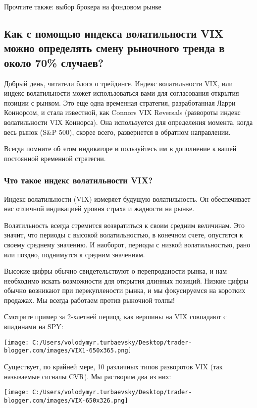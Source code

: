 \documentclass[a5paper]{article}
\begin{document}
Прочтите также: выбор брокера на фондовом рынке

\subsection{Как с помощью индекса волатильности VIX можно определять смену рыночного тренда в около 70\% случаев?}

Добрый день, читатели блога о трейдинге. Индекс волатильности VIX, или индекс волатильности может использоваться вами для согласования открытия позиции с рынком. Это еще одна временная стратегия, разработанная Ларри Коннорсом, и стала известной, как Connors VIX Reversals (развороты индекс волатильности VIX Коннорса). Она используется для определения момента, когда весь рынок (S\&P 500), скорее всего, развернется в обратном направлении.

Всегда помните об этом индикаторе и пользуйтесь им в дополнение к
вашей постоянной временной стратегии.

\subsubsection{Что такое индекс волатильности VIX?}

Индекс волатильности  (VIX) измеряет будущую волатильность. Он обеспечивает нас отличной индикацией уровня страха и жадности на рынке.

Волатильность всегда стремится возвратиться к своим средним величинам. Это значит, что периоды с высокой волатильностью, в конечном счете, опустятся к своему среднему значению. И наоборот, периоды с низкой волатильностью, рано или поздно, поднимутся к средним значениям.

Высокие цифры обычно свидетельствуют о перепроданости рынка, и нам необходимо искать возможности для открытия длинных позиций. Низкие цифры обычно возникают при перекуплености рынка, и мы фокусируемся на коротких продажах. Мы всегда работаем против рыночной толпы!

Смотрите пример за 2-хлетней период, как вершины на VIX совпадают с
впадинами на SPY:

\texttt{[image: C:/Users/volodymyr.turbaevsky/Desktop/trader-blogger.com/images/VIX1-650x365.png]}

Существует, по крайней мере, 10 различных типов разворотов VIX (так
называемые сигналы CVR). Мы растворим два из них:

\texttt{[image: C:/Users/volodymyr.turbaevsky/Desktop/trader-blogger.com/images/VIX-650x326.png]}
\end{document}
